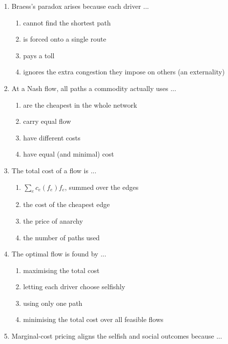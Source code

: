 \documentclass[11pt]{article}
\begin{document}
\begin{enumerate}[itemsep=6pt]
\begin{enumerate}
    \item \(1\)
    \item \(4/3\)
    \item \(8/7\)
    \item \(2\)
  \end{enumerate}
  \item Braess's paradox arises because each driver ...
  \begin{enumerate}
    \item cannot find the shortest path
    \item is forced onto a single route
    \item pays a toll
    \item ignores the extra congestion they impose on others (an externality)
  \end{enumerate}
  \item At a Nash flow, all paths a commodity actually uses ...
  \begin{enumerate}
    \item are the cheapest in the whole network
    \item carry equal flow
    \item have different costs
    \item have equal (and minimal) cost
  \end{enumerate}
  \item The total cost of a flow is ...
  \begin{enumerate}
    \item \(\sum_{e} c_e(f_e) f_e\), summed over the edges
    \item the cost of the cheapest edge
    \item the price of anarchy
    \item the number of paths used
  \end{enumerate}
  \item The optimal flow is found by ...
  \begin{enumerate}
    \item maximising the total cost
    \item letting each driver choose selfishly
    \item using only one path
    \item minimising the total cost over all feasible flows
  \end{enumerate}
  \item Marginal-cost pricing aligns the selfish and social outcomes because ...
  \begin{enumerate}

\end{enumerate}
\end{enumerate}
\end{document}
